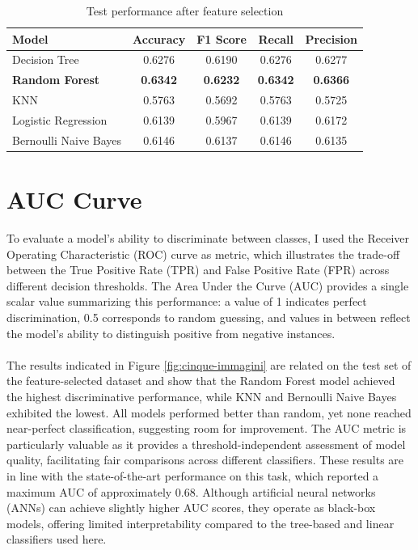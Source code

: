 \begin{table}[ht]
\centering
\caption{Test performance after feature selection}
\label{tab:test_performance_reduced}
\begin{tabular}{lcccc}
\toprule
\textbf{Model} & \textbf{Accuracy} & \textbf{F1 Score} & \textbf{Recall} & \textbf{Precision} \\
\midrule
Decision Tree & 0.6276 & 0.6190 & 0.6276 & 0.6277 \\
\textbf{Random Forest} & \textbf{0.6342} & \textbf{0.6232} & \textbf{0.6342} & \textbf{0.6366} \\
KNN & 0.5763 & 0.5692 & 0.5763 & 0.5725 \\
Logistic Regression & 0.6139 & 0.5967 & 0.6139 & 0.6172 \\
Bernoulli Naive Bayes & 0.6146 & 0.6137 & 0.6146 & 0.6135 \\
\bottomrule
\end{tabular}
\end{table}

\section{AUC Curve}

To evaluate a model's ability to discriminate between classes, I used the Receiver Operating Characteristic (ROC) curve as metric, which illustrates the trade-off between the True Positive Rate (TPR) and False Positive Rate (FPR) across different decision thresholds. The Area Under the Curve (AUC) provides a single scalar value summarizing this performance: a value of 1 indicates perfect discrimination, 0.5 corresponds to random guessing, and values in between reflect the model's ability to distinguish positive from negative instances.\\\\
The results indicated in Figure \ref{fig:cinque-immagini} are related on the test set of the feature-selected dataset and show that the Random Forest model achieved the highest discriminative performance, while KNN and Bernoulli Naive Bayes exhibited the lowest. All models performed better than random, yet none reached near-perfect classification, suggesting room for improvement. The AUC metric is particularly valuable as it provides a threshold-independent assessment of model quality, facilitating fair comparisons across different classifiers. These results are in line with the state-of-the-art performance on this task, which reported a maximum AUC of approximately 0.68. Although artificial neural networks (ANNs) can achieve slightly higher AUC scores, they operate as black-box models, offering limited interpretability compared to the tree-based and linear classifiers used here.

